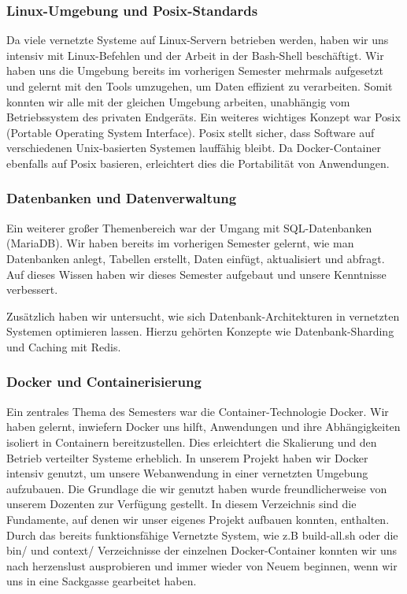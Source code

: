 \subsubsection{Linux-Umgebung und Posix-Standards }
Da viele vernetzte Systeme auf Linux-Servern betrieben werden, haben wir uns intensiv mit Linux-Befehlen und der Arbeit in der Bash-Shell beschäftigt. Wir haben uns die Umgebung bereits im vorherigen Semester mehrmals aufgesetzt und gelernt mit den Tools umzugehen, um Daten effizient zu verarbeiten. Somit konnten wir alle mit der gleichen Umgebung arbeiten, unabhängig vom Betriebssystem des privaten Endgeräts. Ein weiteres wichtiges Konzept war Posix (Portable Operating System Interface). Posix stellt sicher, dass Software auf verschiedenen Unix-basierten Systemen lauffähig bleibt.
Da Docker-Container ebenfalls auf Posix basieren, erleichtert dies die Portabilität von Anwendungen.
\subsubsection{Datenbanken und Datenverwaltung}
Ein weiterer großer Themenbereich war der Umgang mit SQL-Datenbanken (MariaDB). Wir haben bereits im vorherigen Semester gelernt, wie man Datenbanken anlegt, Tabellen erstellt, Daten einfügt, aktualisiert und abfragt. Auf dieses Wissen haben wir dieses Semester aufgebaut und unsere Kenntnisse verbessert.

Zusätzlich haben wir untersucht, wie sich Datenbank-Architekturen in vernetzten Systemen optimieren lassen. Hierzu gehörten Konzepte wie Datenbank-Sharding und Caching mit Redis.
\subsubsection{Docker und Containerisierung }
Ein zentrales Thema des Semesters war die Container-Technologie Docker. Wir haben gelernt, inwiefern Docker uns hilft, Anwendungen und ihre Abhängigkeiten isoliert in Containern bereitzustellen. Dies erleichtert die Skalierung und den Betrieb verteilter Systeme erheblich. In unserem Projekt haben wir Docker intensiv genutzt, um unsere Webanwendung in einer vernetzten Umgebung aufzubauen. Die Grundlage die wir genutzt haben wurde freundlicherweise von unserem Dozenten zur Verfügung gestellt. In diesem Verzeichnis sind die Fundamente, auf denen wir unser eigenes Projekt aufbauen konnten, enthalten. Durch das bereits funktionsfähige Vernetzte System, wie z.B build-all.sh oder die bin/ und context/ Verzeichnisse der einzelnen Docker-Container konnten wir uns nach herzenslust ausprobieren und immer wieder von Neuem beginnen, wenn wir uns in eine Sackgasse gearbeitet haben.

